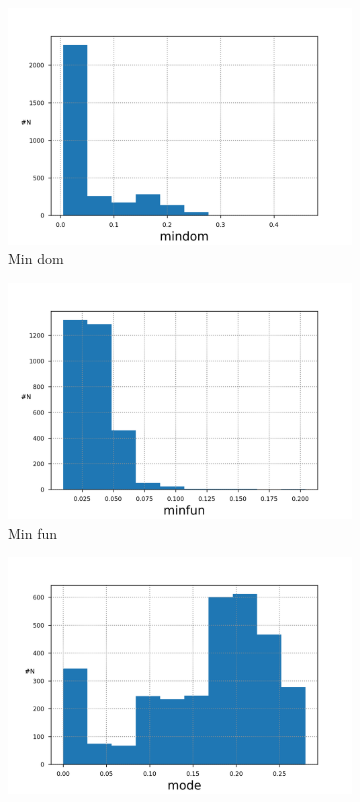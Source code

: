 \documentclass{article}
\begin{document}
        \begin{figure}[H]
            \begin{subfigure}{.5\textwidth}
                \centering
                \includegraphics[width=.8\linewidth]{img1/data_histmindom.png}
                \caption{Min dom}
            \end{subfigure}
            \begin{subfigure}{.5\textwidth}
                \centering
                \includegraphics[width=.8\linewidth]{img1/data_histminfun.png}
                \caption{Min fun}
            \end{subfigure}
            \begin{subfigure}{.5\textwidth}
                \centering
                \includegraphics[width=.8\linewidth]{img1/data_histmode.png}

\end{subfigure}
\end{figure}
\end{document}

